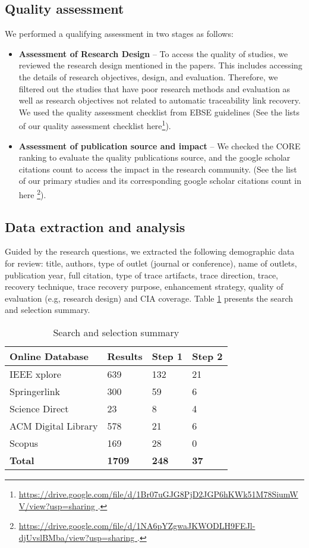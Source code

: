 \documentclass[conference]{IEEEtran}
\begin{document}
\subsection{Quality assessment}
We performed a qualifying assessment in two stages as follows:
\begin{itemize}
\item \textbf{Assessment of Research Design} – To access the quality of studies, we reviewed the research design mentioned in the papers. This includes accessing the details of research objectives, design, and evaluation. Therefore, we filtered out the studies that have poor research methods and evaluation as well as research objectives not related to automatic traceability link recovery. We used the quality assessment checklist from EBSE guidelines (See the lists of our quality assessment checklist here\footnote{\url{ https://drive.google.com/file/d/1Br07uGJG8PjD2JGP6hKWk51M78SiumWV/view?usp=sharing }.}).
\end{itemize}
\begin{itemize}
\item \textbf{Assessment of publication source and impact }– We checked the CORE ranking to evaluate the quality publications source, and the google scholar citations count to access the impact in the research community. (See the list of our primary studies and its corresponding google scholar citations count in here \footnote{\url{ https://drive.google.com/file/d/1NA6pYZgwaJKWODLH9FEJl-djUvslBMba/view?usp=sharing }.}).
\end{itemize}
\subsection{Data extraction and analysis}
Guided by the research questions, we extracted the following demographic data for review: title, authors, type of outlet (journal or conference), name of outlets, publication year, full citation, type of trace artifacts, trace direction, trace, recovery technique, trace recovery purpose, enhancement strategy, quality of evaluation (e.g, research design) and CIA coverage. Table \ref{table:SearchResults} presents the search and selection summary.

\begin{table}[h!]
\begin{tabular} {|p{2.5cm}|p{1cm}|p{1cm}|p{1cm}| }
\hline
\textbf{Online Database } & \textbf{Results} & \textbf{Step 1} & \textbf{Step 2}\\
\hline
IEEE xplore & 639 &132 & 21 \\
\hline
Springerlink & 300 &59 & 6\\
\hline
 Science Direct & 23 &8 & 4\\
 \hline
  ACM Digital Library & 578 &21 & 6\\
  \hline
   Scopus & 169 &28 & 0\\
   \hline
  \textbf{Total} & \textbf{1709} &\textbf{248} & \textbf{37}\\
      \hline
\end{tabular}
\caption{Search and selection summary}
\label{table:SearchResults}
\end{table}
\end{document}

